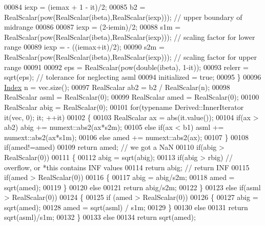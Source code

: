 \begin{DoxyCode}
00084     iexp  = (iemax + 1 - it)/2;
00085     b2    = RealScalar(pow(RealScalar(ibeta),RealScalar(iexp)));    \textcolor{comment}{// upper boundary of midrange}
00086 
00087     iexp  = (2-iemin)/2;
00088     s1m   = RealScalar(pow(RealScalar(ibeta),RealScalar(iexp)));    \textcolor{comment}{// scaling factor for lower range}
00089     iexp  = - ((iemax+it)/2);
00090     s2m   = RealScalar(pow(RealScalar(ibeta),RealScalar(iexp)));    \textcolor{comment}{// scaling factor for upper range}
00091 
00092     eps     = RealScalar(pow(\textcolor{keywordtype}{double}(ibeta), 1-it));
00093     relerr  = sqrt(eps);                                            \textcolor{comment}{// tolerance for neglecting asml}
00094     initialized = \textcolor{keyword}{true};
00095   \}
00096   \hyperlink{namespace_eigen_a62e77e0933482dafde8fe197d9a2cfde}{Index} n = vec.size();
00097   RealScalar ab2 = b2 / RealScalar(n);
00098   RealScalar asml = RealScalar(0);
00099   RealScalar amed = RealScalar(0);
00100   RealScalar abig = RealScalar(0);
00101   \textcolor{keywordflow}{for}(\textcolor{keyword}{typename} Derived::InnerIterator it(vec, 0); it; ++it)
00102   \{
00103     RealScalar ax = abs(it.value());
00104     \textcolor{keywordflow}{if}(ax > ab2)     abig += numext::abs2(ax*s2m);
00105     \textcolor{keywordflow}{else} \textcolor{keywordflow}{if}(ax < b1) asml += numext::abs2(ax*s1m);
00106     \textcolor{keywordflow}{else}             amed += numext::abs2(ax);
00107   \}
00108   \textcolor{keywordflow}{if}(amed!=amed)
00109     \textcolor{keywordflow}{return} amed;  \textcolor{comment}{// we got a NaN}
00110   \textcolor{keywordflow}{if}(abig > RealScalar(0))
00111   \{
00112     abig = sqrt(abig);
00113     \textcolor{keywordflow}{if}(abig > rbig) \textcolor{comment}{// overflow, or *this contains INF values}
00114       \textcolor{keywordflow}{return} abig;  \textcolor{comment}{// return INF}
00115     \textcolor{keywordflow}{if}(amed > RealScalar(0))
00116     \{
00117       abig = abig/s2m;
00118       amed = sqrt(amed);
00119     \}
00120     \textcolor{keywordflow}{else}
00121       \textcolor{keywordflow}{return} abig/s2m;
00122   \}
00123   \textcolor{keywordflow}{else} \textcolor{keywordflow}{if}(asml > RealScalar(0))
00124   \{
00125     \textcolor{keywordflow}{if} (amed > RealScalar(0))
00126     \{
00127       abig = sqrt(amed);
00128       amed = sqrt(asml) / s1m;
00129     \}
00130     \textcolor{keywordflow}{else}
00131       \textcolor{keywordflow}{return} sqrt(asml)/s1m;
00132   \}
00133   \textcolor{keywordflow}{else}
00134     \textcolor{keywordflow}{return} sqrt(amed);

\end{DoxyCode}
